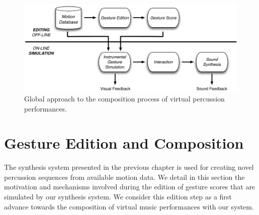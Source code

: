
\begin{figure}%
	\begin{center}
		\includegraphics[width=0.9\columnwidth]{Chapters/6/Pics/Pdf/globalFramework}
	\end{center}
	\vspace{-0.5cm}
	\caption{Global approach to the composition process of virtual percussion performances.}
	\label{fig:composition}
\end{figure}




	\section{Gesture Edition and Composition}
	\label{sec:Music_Composition}

The synthesis system presented in the previous chapter is used for creating novel percussion sequences from available motion data. We detail in this section the motivation and mechanisms involved during the edition of gesture scores that are simulated by our synthesis system. We consider this edition step as a first advance towards the composition of virtual music performances with our system.\\

